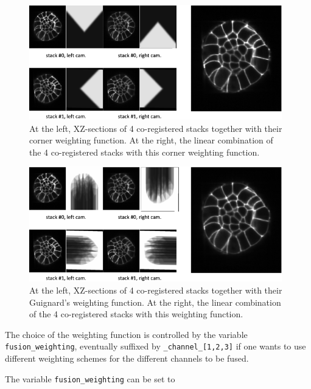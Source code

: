 \begin{figure}
\begin{center}
\includegraphics[height=50mm]{figures/fusion-corner-combination.png}
\end{center}
\caption{\label{fig:cli:fuse:corner:combination} At the left, XZ-sections of 4 co-registered stacks together with their corner weighting function.
At the right, the linear combination of the 4 co-registered stacks with this corner weighting function.}
\end{figure}

\begin{figure}
\begin{center}
\includegraphics[height=50mm]{figures/fusion-guignard-combination.png}
\end{center}
\caption{\label{fig:cli:fuse:guignard:combination} At the left, XZ-sections of 4 co-registered stacks together with their Guignard's weighting function.
At the right, the linear combination of the 4 co-registered stacks with this weighting function.}
\end{figure}



The choice of the weighting function is controlled by the variable \texttt{fusion\_weighting}, eventually suffixed by \texttt{\_channel\_[1,2,3]} if one wants to use different weighting schemes for the different channels to be fused.


The variable \texttt{fusion\_weighting} can be set to

